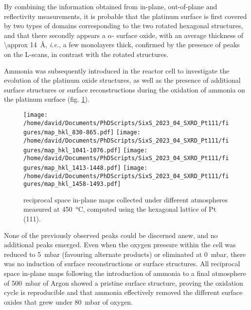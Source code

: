 By combining the information obtained from in-plane, out-of-plane and reflectivity measurements, it is probable that the platinum surface is first covered by two types of domains corresponding to the two rotated hexagonal structures, and that there secondly appears a $\alpha$- surface oxide, with an average thickness of \qty{\approx 14}{\angstrom}, \textit{i.e.}, a few monolayers thick, confirmed by the presence of peaks on the L-scans, in contrast with the rotated structures.


Ammonia was subsequently introduced in the reactor cell to investigate the evolution of the platinum oxide structures, as well as the presence of additional surface structures or surface reconstructions during the oxidation of ammonia on the platinum surface (fig. \ref{fig:MapsPt111B}).

\begin{figure}[!htb]
    \centering
    \texttt{[image: /home/david/Documents/PhDScripts/SixS\_2023\_04\_SXRD\_Pt111/figures/map\_hkl\_830-865.pdf]}
    \texttt{[image: /home/david/Documents/PhDScripts/SixS\_2023\_04\_SXRD\_Pt111/figures/map\_hkl\_1041-1076.pdf]}
    \texttt{[image: /home/david/Documents/PhDScripts/SixS\_2023\_04\_SXRD\_Pt111/figures/map\_hkl\_1413-1448.pdf]}
    \texttt{[image: /home/david/Documents/PhDScripts/SixS\_2023\_04\_SXRD\_Pt111/figures/map\_hkl\_1458-1493.pdf]}
    \caption{
        reciprocal space in-plane maps collected under different atmospheres measured at \qty{450}{\degreeCelsius}, computed using the hexagonal lattice of Pt (111).
    }
    \label{fig:MapsPt111B}
\end{figure}

None of the previously observed peaks could be discerned anew, and no additional peaks emerged.
Even when the oxygen pressure within the cell was reduced to \qty{5}{\milli\bar} (favouring alternate products) or eliminated at \qty{0}{\milli\bar}, there was no induction of surface reconstructions or surface structures.
All reciprocal space in-plane maps following the introduction of ammonia to a final atmosphere of \qty{500}{\milli\bar} of Argon showed a pristine surface structure, proving the oxidation cycle is reproducible and that ammonia effectively removed the different surface oxides that grew under \qty{80}{\milli\bar} of oxygen.

